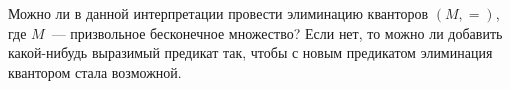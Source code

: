 Можно ли в данной интерпретации провести элиминацию кванторов $(M, =)$, где $M$~--- призвольное бесконечное множество? Если нет, то можно ли добавить
какой-нибудь выразимый предикат так, чтобы с новым предикатом элиминация квантором стала возможной.